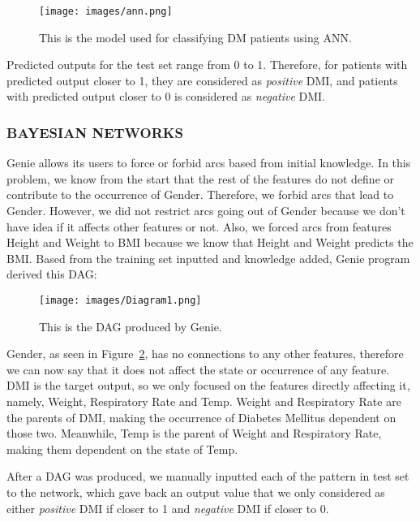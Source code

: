 \documentclass[journal]{./IEEE/IEEEtran}
\begin{document}
\begin{figure}[h]
\begin{center}
\texttt{[image: images/ann.png]}
\caption{This is the model used for classifying DM patients using ANN.}
\label{fig:ann}
\end{center}
\end{figure}
	
	Predicted outputs for the test set range from 0 to 1. Therefore, for patients with predicted output closer to 1, they are considered as {\it positive} DMI, and patients with predicted output closer to 0 is considered as {\it negative} DMI.

\subsubsection {BAYESIAN NETWORKS}
Genie allows its users to force or forbid arcs based from initial knowledge. In this problem, we know from the start that the rest of the features do not define or contribute to the occurrence of Gender. Therefore, we forbid arcs that lead to Gender. However, we did not restrict arcs going out of Gender because we don't have idea if it affects other features or not. Also, we forced arcs from features Height and Weight to BMI because we know that Height and Weight predicts the BMI. Based from the training set inputted and knowledge added, Genie program derived this DAG:

\begin{figure}[h]
\begin{center}
\texttt{[image: images/Diagram1.png]}
\caption{This is the DAG produced by Genie.}
\label{fig:genie}
\end{center}
\end{figure}

Gender, as seen in Figure~\ref{fig:genie}, has no connections to any other features, therefore we can now say that it does not affect the state or occurrence of any feature. DMI is the target output, so we only focused on the features directly affecting it, namely, Weight, Respiratory Rate and Temp. Weight and Respiratory Rate are the parents of DMI, making the occurrence of Diabetes Mellitus dependent on those two. Meanwhile, Temp is the parent of Weight and Respiratory Rate, making them dependent on the state of Temp.

After a DAG was produced, we manually inputted each of the pattern in test set to the network, which gave back an output value that we only considered as either {\it positive} DMI if closer to 1 and {\it negative} DMI if closer to 0.
\end{document}
